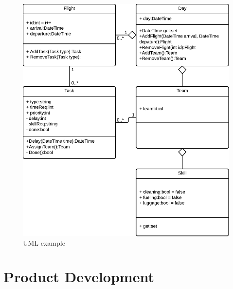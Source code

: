 \documentclass[12pt,a4paper]{report}
\begin{document}
        \begin{figure}
        \centering
        \includegraphics[width=\textwidth]{Grafik/UML}
        \caption{UML example}
        \label{UML}
        \end{figure}

    \part{Product Development}
    
    \printbibliography
\end{document}
